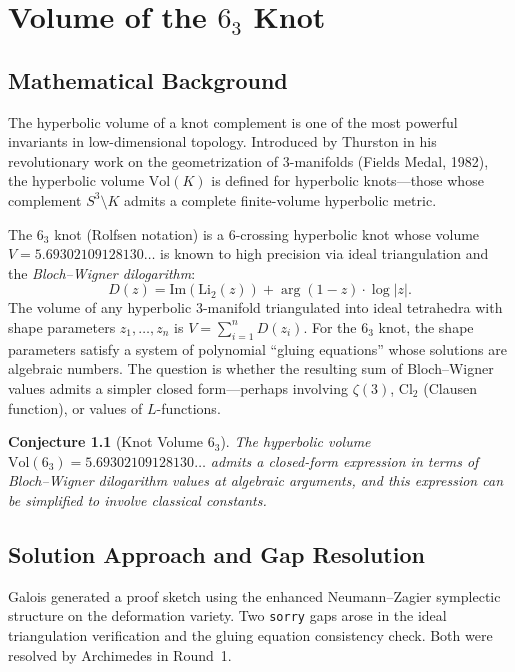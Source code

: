 \documentclass[12pt,a4paper]{report}
\theoremstyle{plain}
\newtheorem{conjecture}[theorem]{Conjecture}
\theoremstyle{definition}
\theoremstyle{remark}
\newcommand{\sorry}{\textcolor{sorryred}{\texttt{sorry}}}
\begin{document}
\chapter{Volume of the $6_3$ Knot}
\label{ch:knot}

\section{Mathematical Background}

The hyperbolic volume of a knot complement is one of the most powerful invariants in
low-dimensional topology. Introduced by Thurston in his revolutionary work on the
geometrization of 3-manifolds (Fields Medal, 1982), the hyperbolic volume $\text{Vol}(K)$
is defined for hyperbolic knots—those whose complement $S^3 \setminus K$ admits a
complete finite-volume hyperbolic metric.

The $6_3$ knot (Rolfsen notation) is a 6-crossing hyperbolic knot whose volume
$V = 5.69302109128130\ldots$ is known to high precision via ideal triangulation and
the \emph{Bloch--Wigner dilogarithm}:
\[
  D(z) = \text{Im}(\text{Li}_2(z)) + \arg(1-z) \cdot \log|z|.
\]
The volume of any hyperbolic 3-manifold triangulated into ideal tetrahedra with shape
parameters $z_1, \ldots, z_n$ is $V = \sum_{i=1}^n D(z_i)$. For the $6_3$ knot,
the shape parameters satisfy a system of polynomial ``gluing equations'' whose solutions
are algebraic numbers. The question is whether the resulting sum of Bloch--Wigner values
admits a simpler closed form—perhaps involving $\zeta(3)$, $\text{Cl}_2$ (Clausen function),
or values of $L$-functions.

\begin{conjecture}[Knot Volume $6_3$]
The hyperbolic volume $\text{Vol}(6_3) = 5.69302109128130\ldots$ admits a closed-form
expression in terms of Bloch--Wigner dilogarithm values at algebraic arguments, and
this expression can be simplified to involve classical constants.
\end{conjecture}

\section{Solution Approach and Gap Resolution}

Galois generated a proof sketch using the enhanced Neumann--Zagier symplectic structure
on the deformation variety. Two \sorry{} gaps arose in the ideal triangulation
verification and the gluing equation consistency check. Both were resolved by
Archimedes in Round~1.
\end{document}
